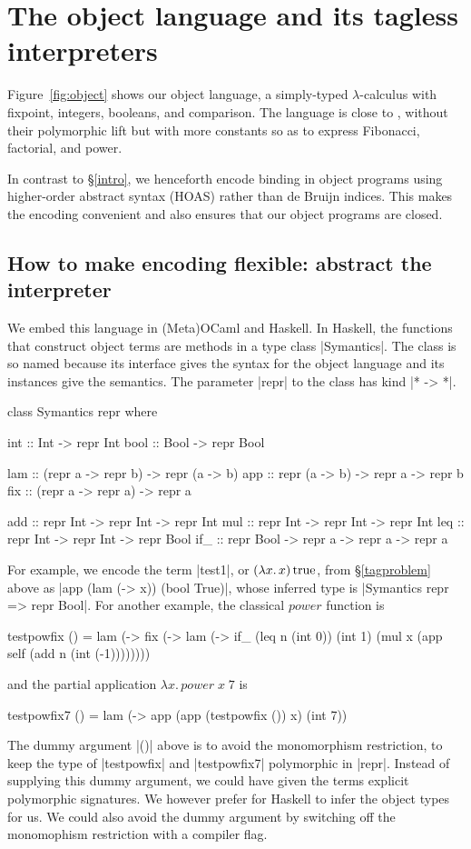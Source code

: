 \documentclass[preprint]{sigplanconf}
\newcommand{\fun}[1]{\mathopen{\lambda\mathord{#1}.\,}}
\newcommand{\True}{\mathinner{\mathrm{true}}}
\begin{document}
\section{The object language and its tagless interpreters}\label{language}

Figure~\ref{fig:object} shows our object language, a simply-typed
$\lambda$-calculus with fixpoint, integers, booleans, and comparison.
The language is close to , without their polymorphic
lift but with more constants so as to express Fibonacci, factorial, and
power.

In contrast to \S\ref{intro}, we henceforth encode 
binding in object programs using higher-order
abstract syntax (HOAS) \citep{miller-manipulating,pfenning-higher-order}
rather than de Bruijn indices. This makes the encoding convenient and
also ensures that our object programs are closed.

\subsection{How to make encoding flexible: abstract the interpreter}
\label{encoding}

We embed this language in (Meta)OCaml and Haskell.  In Haskell,
the functions that construct object terms are methods in a type class
|Symantics|. The class is so named because its interface gives the syntax for
the object language and its instances give the semantics.
The parameter |repr| to the class has kind |* -> *|.
\begin{code}
class Symantics repr where

  int  :: Int  -> repr Int
  bool :: Bool -> repr Bool

  lam :: (repr a -> repr b) -> repr (a -> b)
  app :: repr (a -> b) -> repr a -> repr b
  fix :: (repr a -> repr a) -> repr a

  add :: repr Int -> repr Int -> repr Int
  mul :: repr Int -> repr Int -> repr Int
  leq :: repr Int -> repr Int -> repr Bool
  if_ :: repr Bool -> repr a -> repr a -> repr a
\end{code}
For example, we encode the term |test1|, or $(\fun{x}x)\True$, from
\S\ref{tagproblem} above as |app (lam (\x -> x)) (bool True)|,
whose inferred type is |Symantics repr => repr Bool|.
For another example, the classical $\mathit{power}$ function is
\begin{code}
testpowfix () = 
  lam (\x -> fix (\self -> lam (\n ->
  if_ (leq n (int 0)) (int 1)
      (mul x (app self (add n (int (-1))))))))
\end{code}
and the partial application $\fun{x} \mathit{power}\;x\;7$ is
\begin{code}
testpowfix7 () = 
  lam (\x -> app (app (testpowfix ()) x)
                 (int 7))
\end{code}
The dummy argument |()| above is to avoid the monomorphism
restriction, to keep the type of |testpowfix| and |testpowfix7|
polymorphic in |repr|. Instead of supplying this dummy
argument, we could have given the terms explicit polymorphic
signatures.  We however prefer for
Haskell to infer the object types for us. We could also
avoid the dummy argument by switching off the monomophism restriction
with a compiler flag.
\end{document}
